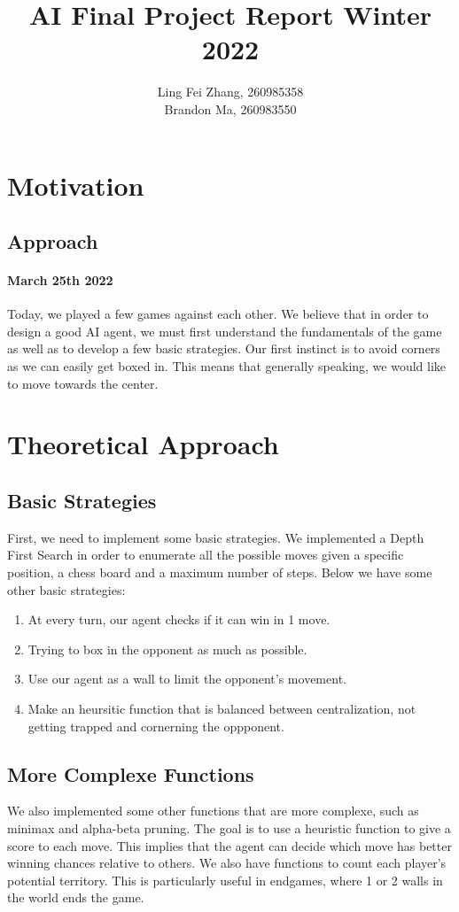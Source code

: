 \documentclass[12pt,a4paper]{article}
\author{Ling Fei Zhang, 260985358\\
Brandon Ma, 260983550}
\begin{document}
\title{AI Final Project Report Winter 2022}    
\maketitle


\section{Motivation}
\subsection{Approach}
\paragraph{March 25th 2022}
Today, we played a few games against each other. We believe that in order to design a good AI agent, 
we must first understand the fundamentals of the game as well as to develop a few basic strategies. 
Our first instinct is to avoid 
corners as we can easily get boxed in. This means that generally speaking, we would 
like to move towards the center. 


\section{Theoretical Approach}
\subsection{Basic Strategies}
First, we need to implement some basic strategies. We implemented a Depth First Search in order to enumerate 
all the possible moves given a specific position, a chess board and a maximum number of steps. Below we 
have some other basic strategies:
\begin{enumerate}
    \item At every turn, our agent checks if it can win in 1 move. 
    \item Trying to box in the opponent as much as possible.
    \item Use our agent as a wall to limit the opponent's movement.
    \item Make an heursitic function that is balanced between centralization, not getting trapped and cornerning the oppponent. 
\end{enumerate}
\subsection{More Complexe Functions}
We also implemented some other functions that are more complexe, such as minimax and alpha-beta pruning. 
The goal is to use a heuristic function to give a score to each move. This implies that the agent can 
decide which move has better winning chances relative to others. We also have functions to count each player's 
potential territory. This is particularly useful in endgames, where 1 or 2 walls in the world ends the game. 
\end{document}
